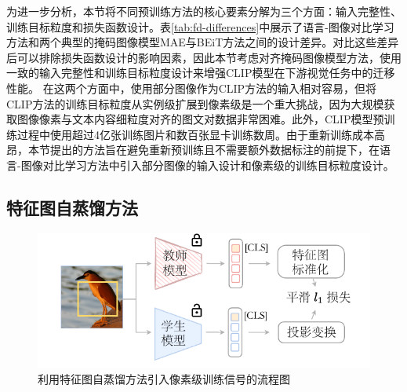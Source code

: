 为进一步分析，本节将不同预训练方法的核心要素分解为三个方面：输入完整性、训练目标粒度和损失函数设计。表\ref{tab:fd-differences}中展示了语言-图像对比学习方法和两个典型的掩码图像模型MAE与BEiT\cite{bao2021beit}方法之间的设计差异。对比这些差异后可以排除损失函数设计的影响因素，因此本节考虑对齐掩码图像模型方法，使用一致的输入完整性和训练目标粒度设计来增强CLIP模型在下游视觉任务中的迁移性能。
在这两个方面中，使用部分图像作为CLIP方法的输入相对容易\cite{FLIP}，但将CLIP方法的训练目标粒度从实例级扩展到像素级是一个重大挑战，因为大规模获取图像像素与文本内容细粒度对齐的图文对数据非常困难。此外，CLIP模型预训练过程中使用超过4亿张训练图片和数百张显卡训练数周。由于重新训练成本高昂，本节提出的方法旨在避免重新预训练且不需要额外数据标注的前提下，在语言-图像对比学习方法中引入部分图像的输入设计和像素级的训练目标粒度设计。

\subsection{特征图自蒸馏方法}

\begin{figure}
  \centering
  \includegraphics[width=0.8\linewidth]{figures/fd-overall.pdf}
  \caption{利用特征图自蒸馏方法引入像素级训练信号的流程图}
  \label{fig:fd-overall}
\end{figure}




